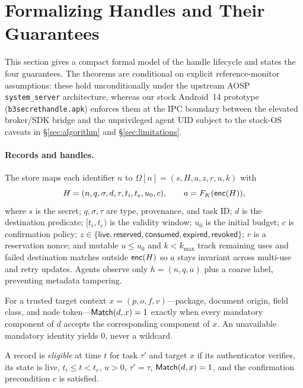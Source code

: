 \section{Formalizing Handles and Their Guarantees}
\label{sec:model}

This section gives a compact formal model of the handle lifecycle and states the four guarantees. The theorems are conditional on explicit reference-monitor assumptions: these hold unconditionally under the upstream AOSP \texttt{system\_server} architecture, whereas our stock Android~14 prototype (\texttt{b3secrethandle.apk}) enforces them at the IPC boundary between the elevated broker/SDK bridge and the unprivileged agent UID subject to the stock-OS caveats in \S\ref{sec:algorithm} and \S\ref{sec:limitations}.

\paragraph{Records and handles.} The store maps each identifier $n$ to $\Omega[n]=(s,H,a,z,r,u,k)$ with
\begin{equation}
H=(n,q,\sigma,d,\tau,t_i,t_e,u_0,c),\qquad a=F_K(\mathsf{enc}(H)),
\label{eq:record}
\end{equation}
where $s$ is the secret; $q,\sigma,\tau$ are type, provenance, and task ID; $d$ is the destination predicate; $[t_i,t_e)$ is the validity window; $u_0$ is the initial budget; $c$ is confirmation policy; $z\in\{\mathsf{live},\mathsf{reserved},\mathsf{consumed},\mathsf{expired},\mathsf{revoked}\}$; $r$ is a reservation nonce; and mutable $u\le u_0$ and $k<k_{\max}$ track remaining uses and failed destination matches outside $\mathsf{enc}(H)$ so $a$ stays invariant across multi-use and retry updates. Agents observe only $h=(n,q,a)$ plus a coarse label, preventing metadata tampering.

\begin{definition}
\label{def:match}
For a trusted target context $x=(p,o,f,v)$---package, document origin, field class, and node token---$\mathsf{Match}(d,x)=1$ exactly when every mandatory component of $d$ accepts the corresponding component of $x$. An unavailable mandatory identity yields $0$, never a wildcard.
\end{definition}

\begin{definition}
\label{def:elig}
A record is \emph{eligible} at time $t$ for task $\tau'$ and target $x$ if its authenticator verifies, its state is live, $t_i\le t<t_e$, $u>0$, $\tau'=\tau$, $\mathsf{Match}(d,x)=1$, and the confirmation precondition $c$ is satisfied.
\end{definition}

